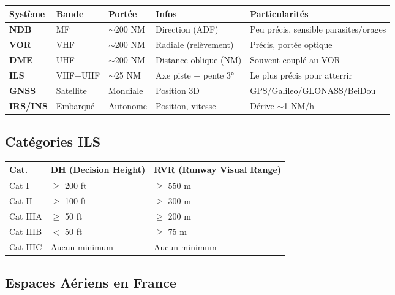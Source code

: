 \documentclass[11pt,a4paper]{article}
\begin{document}
\begin{tabular}{p{1.8cm}p{2cm}p{1.5cm}p{3cm}p{6cm}}
\toprule
\textbf{Système} & \textbf{Bande} & \textbf{Portée} & \textbf{Infos} & \textbf{Particularités} \\
\midrule
\textbf{NDB} & MF & $\sim$200 NM & Direction (ADF) & Peu précis, sensible parasites/orages \\
\textbf{VOR} & VHF & $\sim$200 NM & Radiale (relèvement) & Précis, portée optique \\
\textbf{DME} & UHF & $\sim$200 NM & Distance oblique (NM) & Souvent couplé au VOR \\
\textbf{ILS} & VHF+UHF & $\sim$25 NM & Axe piste + pente 3° & Le plus précis pour atterrir \\
\textbf{GNSS} & Satellite & Mondiale & Position 3D & GPS/Galileo/GLONASS/BeiDou \\
\textbf{IRS/INS} & Embarqué & Autonome & Position, vitesse & Dérive $\sim$1 NM/h \\
\bottomrule
\end{tabular}

\subsection{Catégories ILS}

\begin{tabular}{p{2cm}p{5cm}p{7.5cm}}
\toprule
\textbf{Cat.} & \textbf{DH (Decision Height)} & \textbf{RVR (Runway Visual Range)} \\
\midrule
Cat I & $\geq$ 200 ft & $\geq$ 550 m \\
Cat II & $\geq$ 100 ft & $\geq$ 300 m \\
Cat IIIA & $\geq$ 50 ft & $\geq$ 200 m \\
Cat IIIB & $<$ 50 ft & $\geq$ 75 m \\
Cat IIIC & Aucun minimum & Aucun minimum \\
\bottomrule
\end{tabular}

\subsection{Espaces Aériens en France}
\end{document}
